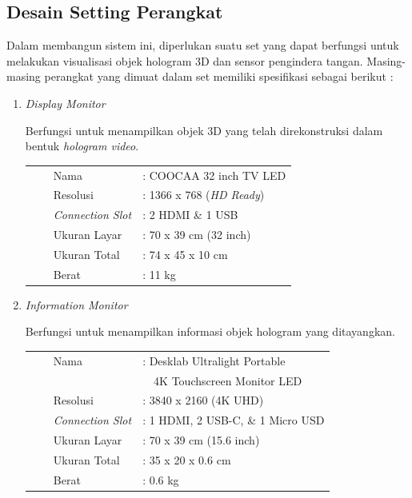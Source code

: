 	\subsection{Desain Setting Perangkat}
	\vspace{1ex}
		Dalam membangun sistem ini, diperlukan suatu set yang dapat berfungsi untuk melakukan visualisasi objek hologram 3D dan sensor pengindera tangan. Masing-masing perangkat yang dimuat dalam set memiliki spesifikasi sebagai berikut :
		\begin{enumerate}[nolistsep]
			\item \textit{Display Monitor}
			
			Berfungsi untuk menampilkan objek 3D yang telah direkonstruksi dalam bentuk \textit{hologram video}.
			\vspace{-2ex}
			\begin{table}[H]
				\begin{flushleft}
				\begin{tabular}{L{0.5cm} l L{2.55cm} l}
					&\textbullet & Nama 			& : COOCAA 32 inch TV LED \\
					&\textbullet & Resolusi 		& : 1366 x 768 (\textit{HD Ready}) \\
					&\textbullet & \textit{Connection Slot}	& : 2 HDMI \& 1 USB \\
					&\textbullet & Ukuran Layar & : 70 x 39 cm (32 inch) \\
					&\textbullet & Ukuran Total & : 74 x 45 x 10 cm \\
					&\textbullet & Berat 		& : 11 kg \\
				\end{tabular}
				\end{flushleft}
			\end{table}
			\vspace{-3.5ex}
			
			\item \textit{Information Monitor}
			
			Berfungsi untuk menampilkan informasi objek hologram yang ditayangkan.
			\vspace{-2ex}
			\begin{table}[H]
				\begin{flushleft}
					\begin{tabular}{L{0.5cm} l L{2.55cm} l}
						&\textbullet & Nama 		& : Desklab Ultralight Portable\\
						&  &  &  \         \     4K Touchscreen Monitor LED \\
						&\textbullet & Resolusi 	& : 3840 x 2160 (4K UHD)\\
						&\textbullet & \textit{Connection Slot}	& : 1 HDMI, 2 USB-C, \& 1 Micro USD \\
						&\textbullet & Ukuran Layar & : 70 x 39 cm (15.6 inch) \\
						&\textbullet & Ukuran Total & : 35 x 20 x 0.6 cm\\
						&\textbullet & Berat 		& : 0.6 kg \\
					\end{tabular}
				\end{flushleft}
			\end{table}
			\vspace{-3.5ex}
			

\end{enumerate}
